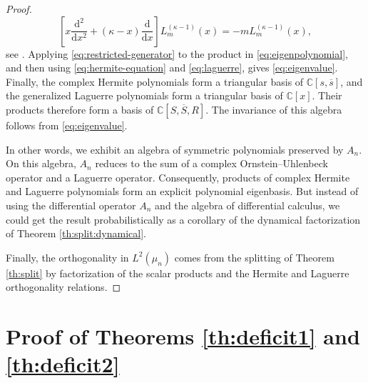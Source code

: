 \documentclass[11pt,reqno]{amsart}
\numberwithin{equation}{section}%
\numberwithin{figure}{section}%
\numberwithin{table}{section}
\theoremstyle{plain}
\theoremstyle{definition}
\begin{document}
\begin{proof}
\begin{equation}
    \left[
      x\frac{\mathrm d^2}{\mathrm dx^2}
      +(\kappa-x)\frac{\mathrm d}{\mathrm dx}
    \right]L_m^{(\kappa-1)}(x)
    =-mL_m^{(\kappa-1)}(x),
  \end{equation}
  see \cite{Szego}. Applying \eqref{eq:restricted-generator} to the product in
  \eqref{eq:eigenpolynomial}, and then using \eqref{eq:hermite-equation} and
  \eqref{eq:laguerre}, gives \eqref{eq:eigenvalue}. Finally, the complex
  Hermite polynomials form a triangular basis of $\mathbb C[s,\overline s]$,
  and the generalized Laguerre polynomials form a triangular basis of
  $\mathbb C[x]$. Their products therefore form a basis of
  $\mathbb C[S,\overline S,R]$. The invariance of this algebra follows from
  \eqref{eq:eigenvalue}.

  In other words, we exhibit an algebra of symmetric polynomials preserved by
  $A_n$. On this algebra, $A_n$ reduces to the sum of a complex
  Ornstein--Uhlenbeck operator and a Laguerre operator. Consequently, products
  of complex Hermite and Laguerre polynomials form an explicit polynomial
  eigenbasis. But instead of using the differential operator $A_n$ and the
  algebra of differential calculus, we could get the result probabilistically
  as a corollary of the dynamical factorization of Theorem
  \ref{th:split:dynamical}.

  Finally, the orthogonality in $L^2(\mu_n)$ comes from the splitting of
  Theorem \ref{th:split} by factorization of the scalar products and the
  Hermite and Laguerre orthogonality relations.
\end{proof}

\section{Proof of Theorems \ref{th:deficit1} and \ref{th:deficit2}}
\label{se:proof:th:deficit}
\end{document}
